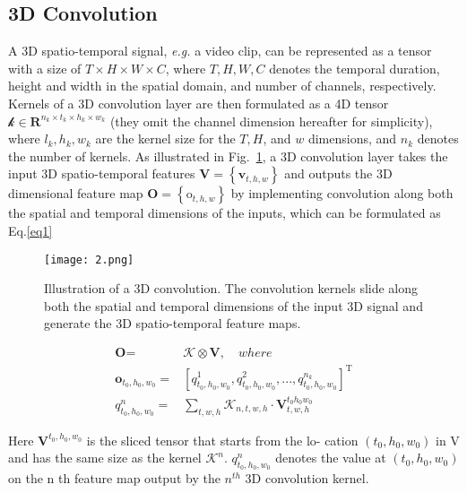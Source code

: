 \documentclass[10pt,twocolumn,letterpaper]{article}
\begin{document}
\subsection{3D Convolution}
A 3D spatio-temporal signal, \textit{e.g.} a video clip, can be
represented as a tensor with a size of $T \times H \times W \times C$, where
$T, H, W, C$ denotes the temporal duration, height and width
in the spatial domain, and number of channels, respectively.
Kernels of a 3D convolution layer are then formulated as
a 4D tensor $\mathcal{k} \in \textbf{R}^{n_k\times t_k \times h_k\times w_k}$ (they omit the channel dimension hereafter for simplicity), where $l_k, h_k, w_k$ are the
kernel size for the $T, H$, and $w$ dimensions, and $n_k$ denotes the number of kernels. As illustrated in Fig.~\ref{fig1}, a 3D convolution layer takes the input 3D spatio-temporal features
$\textbf{V} = \left\lbrace \textbf{v}_{t,h,w}\right\rbrace $ and outputs the 3D dimensional feature map
$\textbf{O}=\left\lbrace\text{o}_{t,h,w}\right\rbrace$ by implementing convolution along both the spatial and temporal dimensions of the inputs, which can be formulated as Eq.\ref{eq1}
\begin{figure}[ht]
	\centering
	\texttt{[image: 2.png]}
	\caption{Illustration of a 3D convolution. The convolution kernels
		slide along both the spatial and temporal dimensions of the input
		3D signal and generate the 3D spatio-temporal feature maps.}
	\label{fig1}
\end{figure}
\begin{equation}
	\begin{aligned}
	\textbf{O} = &\mathcal{K} \otimes \textbf{V},\quad where\\
	\textbf{o}_{t_0,h_0,w_0} =& \left[q_{t_0,h_0,w_0}^1,q_{t_0,h_0,w_0}^2,...,q_{t_0,h_0,w_0}^{n_k}\right]^\mathrm{T}\\
	q_{t_0,h_0,w_0}^{n} = &\sum_{t,w,h} \mathcal{K}_{n,t,w,h} \cdot \textbf{V}_{t,w,h}^{t_0h_0w_0}
	\end{aligned}
	\label{eq1}
\end{equation}
\par
Here $\textbf{V}^{t_0,h_0,w_0}$
is the sliced tensor that starts from the lo-
cation $\left(t_0,h_0,w_0\right)$ in V and has the same size as the kernel
$\mathcal{K}^n$. $q_{t_0,h_0,w_0}^n$ denotes the value at $\left(t_0,h_0,w_0\right)$ on the n th
feature map output by the $n^{th}$ 3D convolution kernel.
\end{document}
